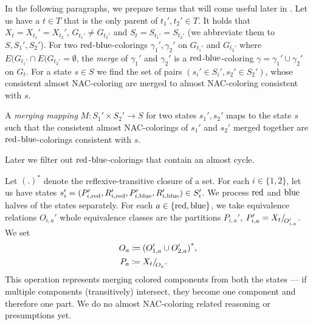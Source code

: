 \subsubsection*{\JoinNode{}}

In the following paragraphs,
we prepare terms that will come useful later in .
Let us have a \JoinNode{} \( t \in T \) that is
the only parent of \( t_1', t_2' \in T \).
It holds that \( X_t = X_{t_1}' = X_{t_2}' \),
\( G_{t_1'} \ne G_{t_2'} \)
and \( S_t = S_{t_1'} = S_{t_2'} \)
(we abbreviate them to \( S, S_1', S_2' \)).
%
For two \( \text{red} \)-\( \text{blue} \)-colorings \( \gamma_1', \gamma_2' \)
on \( G_{t_1'} \) and \( G_{t_2'} \)
where \( E(G_{t_1'} \cap E(G_{t_2'} = \emptyset \),
the \emph{merge} of \( \gamma_1' \) and \( \gamma_2' \)
is a \( \text{red} \)-\( \text{blue} \)-coloring \( \gamma = \gamma_1' \cup \gamma_2' \)
on \( G_t \).
%
For a state \( s \in S \) we find the set of
pairs \( (s_i' \in S_i', s_2' \in S_2') \),
whose consistent almost NAC-coloring are merged
to almost NAC-coloring consistent with \( s \).

\begin{definition}
	A \emph{merging mapping} \( M: S_1' \times S_2' \to S \)
	for two states \( s_1', s_2' \)
	maps to the state \( s \)
	such that the consistent almost NAC-colorings of \( s_1' \) and \( s_2' \)
	merged together
	are \( \text{red} \)-\( \text{blue} \)-colorings consistent with \( s \).
\end{definition}
%
Later we filter out \( \text{red} \)-\( \text{blue} \)-colorings that contain an almost cycle.

Let \( {(.)}^* \) denote the reflexive-transitive closure of a set.
For each \( i \in \{1, 2\} \), let us have states
\( s_i' = (P_{i,\text{red}}', R_{i,\text{red}}', P_{i,\text{blue}}', R_{i,\text{blue}}') \in S_i' \).
%
We process \( \text{red} \) and \( \text{blue} \) halves of the states separately.
For each \( a \in \{\text{red}, \text{blue}\} \),
we take equivalence relations \( O_{i, a}' \)
whole equivalence classes are the partitions \( P_{i, a}' \),
\( P_{i, a}' = X_t{/\!}_{O_{i, a}'}\).
We set
%
\begin{align*}
	O_a & \coloneqq {(O_{1, a}' \cup O_{2, a}')}^*, \\
	P_a & \coloneqq X_t{/\!}_{O_a}.
\end{align*}
%
This operation represents merging colored components from both the states
--- if multiple components (transitively) intersect, they become one
component and therefore one part.
We do no almost NAC-coloring related reasoning or presumptions yet.

